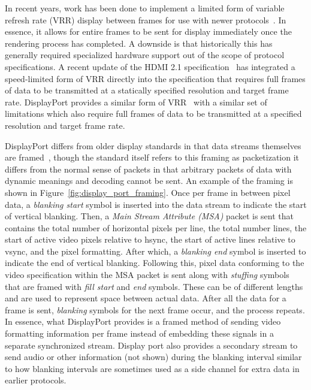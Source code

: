     In recent years, work has been done to implement a limited form of variable refresh rate (VRR) display between frames for use with newer protocols~\cite{AMD2019,NVIDIA2020_1}. In essence, it allows for entire frames to be sent for display immediately once the rendering process has completed. A downside is that historically this has generally required specialized hardware support out of the scope of protocol specifications. A recent update of the HDMI 2.1 specification~\cite{HDMIForum2018} has integrated a speed-limited form of VRR directly into the specification that requires full frames of data to be transmitted at a statically specified resolution and target frame rate. DisplayPort provides a similar form of VRR~\cite{VESA2014} with a similar set of limitations which also require full frames of data to be transmitted at a specified resolution and target frame rate.

    DisplayPort differs from older display standards in that data streams themselves are framed~\cite{VESA2011,Wiley2011}, though the standard itself refers to this framing as packetization it differs from the normal sense of packets in that arbitrary packets of data with dynamic meanings and decoding cannot be sent. An example of the framing is shown in Figure~\ref{fig:display_port_framing}. Once per frame in between pixel data, a {\it blanking start} symbol is inserted into the data stream to indicate the start of vertical blanking. Then, a {\it Main Stream Attribute (MSA)} packet is sent that contains the total number of horizontal pixels per line, the total number lines, the start of active video pixels relative to hsync, the start of active lines relative to vsync, and the pixel formatting. After which, a {\it blanking end} symbol is inserted to indicate the end of vertical blanking. Following this, pixel data conforming to the video specification within the MSA packet is sent along with {\it stuffing} symbols that are framed with {\it fill start} and {\it end} symbols. These can be of different lengths and are used to represent space between actual data. After all the data for a frame is sent, {\it blanking} symbols for the next frame occur, and the process repeats. In essence, what DisplayPort provides is a framed method of sending video formatting information per frame instead of embedding these signals in a separate synchronized stream. Display port also provides a secondary stream to send audio or other information (not shown) during the blanking interval similar to how blanking intervals are sometimes used as a side channel for extra data in earlier protocols.


